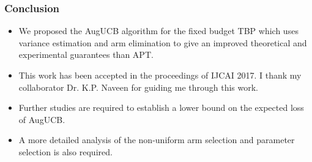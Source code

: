 \begin{frame}
\frametitle{Conclusion}
\begin{itemize}
\item<1-> We proposed the AugUCB algorithm for the fixed budget TBP  which uses variance estimation and arm elimination to give an improved theoretical and experimental guarantees than APT.
\item<1-> This work has been accepted in the proceedings of IJCAI 2017. I thank my collaborator Dr. K.P. Naveen for guiding me through this work.
\item<2-> Further studies are required to establish a lower bound on the expected loss of AugUCB.
\item<3-> A more detailed analysis of the non-uniform arm selection and parameter selection is also required.
\end{itemize}
\end{frame}


%
